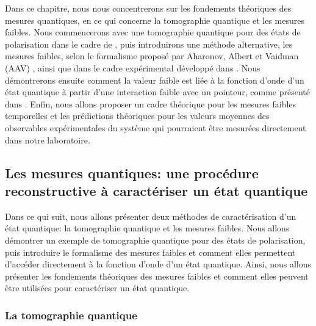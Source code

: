 \begin{onehalfspace}

    Dans ce chapitre, nous nous concentrerons sur les
    fondements théoriques des mesures quantiques, en ce qui concerne la
    tomographie quantique et les mesures faibles. Nous commencerons
    avec une tomographie quantique pour des états de polarisation dans
    le cadre de \cite{Kwiat}, puis introduirons une méthode alternative,
    les mesures faibles, selon le formalisme proposé par Aharonov,
    Albert et Vaidman (AAV) \cite{Aharonov}, ainsi que dans le cadre
    expérimental développé dans \cite{Lundeen_Resch}. Nous 
    démontrerons ensuite comment la valeur faible est liée à la
    fonction d’onde d’un état quantique à partir d'une interaction
    faible avec un pointeur, comme présenté dans \cite{Lundeen_Bamber}.
    Enfin, nous allons proposer un cadre théorique pour les mesures
    faibles temporelles et les prédictions théoriques pour les valeurs
    moyennes des observables expérimentales du système qui pourraient
    être mesurées directement dans notre laboratoire.

\end{onehalfspace}

\subsection{Les mesures quantiques: une procédure reconstructive à caractériser un état quantique}

\begin{onehalfspace}
    Dans ce qui suit, nous allons présenter deux méthodes de caractérisation d'un état quantique: la tomographie quantique et les mesures faibles.
    Nous allons démontrer un exemple de tomographie quantique pour des états de polarisation, puis introduire le formalisme des mesures faibles et comment elles permettent d'accéder directement à la fonction d'onde d'un état quantique.
    Ainsi, nous allons présenter les fondements théoriques des mesures faibles et comment elles peuvent être utilisées pour caractériser un état quantique.
\end{onehalfspace}

\subsubsection{La tomographie quantique}

